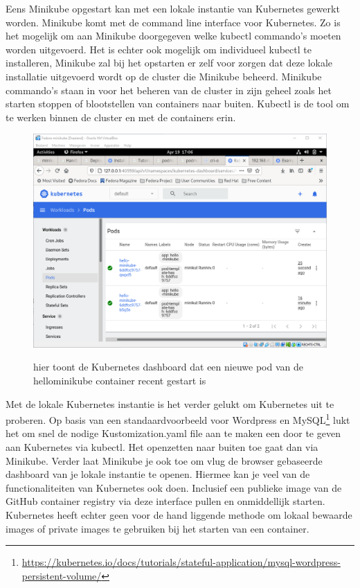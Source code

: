 Eens Minikube opgestart kan met een lokale instantie van Kubernetes gewerkt worden. Minikube komt met de command line interface voor Kubernetes. Zo is het mogelijk om aan Minikube doorgegeven welke kubectl commando’s moeten worden uitgevoerd. Het is echter ook mogelijk om individueel kubectl te installeren, Minikube zal bij het opstarten er zelf voor zorgen dat deze lokale installatie uitgevoerd wordt op de cluster die Minikube beheerd.  Minikube commando’s staan in voor het beheren van de cluster in zijn geheel zoals het starten stoppen of blootstellen van containers naar buiten. Kubectl is de tool om te werken binnen de cluster en met de containers erin.
\begin{figure}[h]
    \includegraphics[width=\linewidth]{img/kubenetesDash.png}
    \label{fig:kubenetesDash}
    \caption[the kubenetes Dashboard]{hier toont de Kubernetes dashboard dat een nieuwe pod van de hellominikube container recent gestart is}
    \centering
\end{figure}

Met de lokale Kubernetes instantie is het verder gelukt om Kubernetes uit te proberen. Op basis van een standaardvoorbeeld voor Wordpress en MySQL\footnote{\url{https://kubernetes.io/docs/tutorials/stateful-application/mysql-wordpress-persistent-volume/}}  lukt het om snel de nodige Kustomization.yaml file aan te maken een door te geven aan Kubernetes via kubectl. Het openzetten naar buiten toe gaat dan via Minikube. Verder laat Minikube je ook toe om vlug de browser gebaseerde dashboard van je lokale instantie te openen. Hiermee kan je veel van de functionaliteiten van Kubernetes ook doen. Inclusief een publieke image van de GitHub container registry via deze interface pullen en onmiddellijk starten. Kubernetes heeft echter geen voor de hand liggende methode om lokaal bewaarde images of private images te gebruiken bij het starten van een container.

